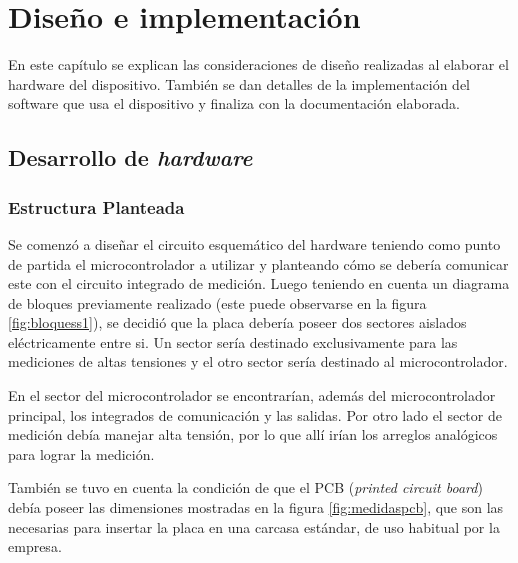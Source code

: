 \chapter{Diseño e implementación} %

En este capítulo se explican las consideraciones de diseño realizadas al elaborar el hardware del dispositivo. También se dan detalles de la implementación del software que usa el dispositivo y finaliza con la documentación elaborada.
\label{Chapter3} 

\section{Desarrollo de \textit{hardware}}
 
\subsection{Estructura Planteada }

Se comenzó a diseñar el circuito esquemático del hardware teniendo como punto de partida el microcontrolador a utilizar y planteando cómo se debería comunicar este con el circuito integrado de medición. Luego teniendo en cuenta un diagrama de bloques previamente realizado (este puede observarse en la figura \ref{fig:bloquess1}), se decidió que la placa debería poseer dos sectores aislados eléctricamente entre si. Un sector sería destinado exclusivamente para las mediciones de altas tensiones y el otro sector sería destinado al microcontrolador.

En el sector del microcontrolador se encontrarían, además del microcontrolador principal, los integrados de comunicación y las salidas.
Por otro lado el sector de medición debía manejar alta tensión, por lo que allí irían los arreglos analógicos para lograr la medición. 

También se tuvo en cuenta la condición de que el PCB (\textit{printed circuit board}) debía poseer las dimensiones mostradas en la figura \ref{fig:medidaspcb}, que son las necesarias para insertar la placa en una carcasa estándar, de uso habitual por la empresa.

